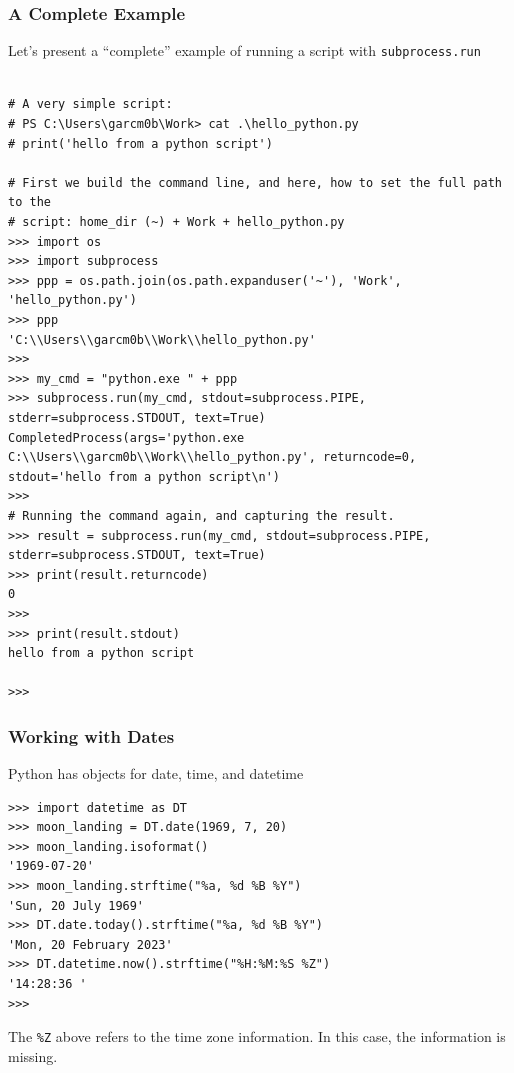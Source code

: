 \documentclass[aspectratio=169]{beamer}
\begin{document}
\begin{frame}[fragile]
\frametitle{A Complete Example}
Let's present a ``complete'' example of running a script with \texttt{subprocess.run}

\tiny
\begin{verbatim}

# A very simple script:
# PS C:\Users\garcm0b\Work> cat .\hello_python.py
# print('hello from a python script')

# First we build the command line, and here, how to set the full path to the
# script: home_dir (~) + Work + hello_python.py
>>> import os
>>> import subprocess
>>> ppp = os.path.join(os.path.expanduser('~'), 'Work', 'hello_python.py')
>>> ppp
'C:\\Users\\garcm0b\\Work\\hello_python.py'
>>>
>>> my_cmd = "python.exe " + ppp
>>> subprocess.run(my_cmd, stdout=subprocess.PIPE, stderr=subprocess.STDOUT, text=True)
CompletedProcess(args='python.exe C:\\Users\\garcm0b\\Work\\hello_python.py', returncode=0, stdout='hello from a python script\n')
>>>
# Running the command again, and capturing the result.
>>> result = subprocess.run(my_cmd, stdout=subprocess.PIPE, stderr=subprocess.STDOUT, text=True)
>>> print(result.returncode)
0
>>>
>>> print(result.stdout)
hello from a python script

>>>
\end{verbatim}
\normalsize

\end{frame}


\begin{frame}[fragile]
\frametitle{Working with Dates}

Python has objects for date, time, and datetime

\scriptsize
\begin{verbatim}
>>> import datetime as DT
>>> moon_landing = DT.date(1969, 7, 20)
>>> moon_landing.isoformat()
'1969-07-20'
>>> moon_landing.strftime("%a, %d %B %Y")
'Sun, 20 July 1969'
>>> DT.date.today().strftime("%a, %d %B %Y")
'Mon, 20 February 2023'
>>> DT.datetime.now().strftime("%H:%M:%S %Z")
'14:28:36 '
>>>
\end{verbatim}
The \texttt{\%Z} above refers to the time zone information. In this case, the information is missing. 
\end{frame}
%
%
\end{document}
